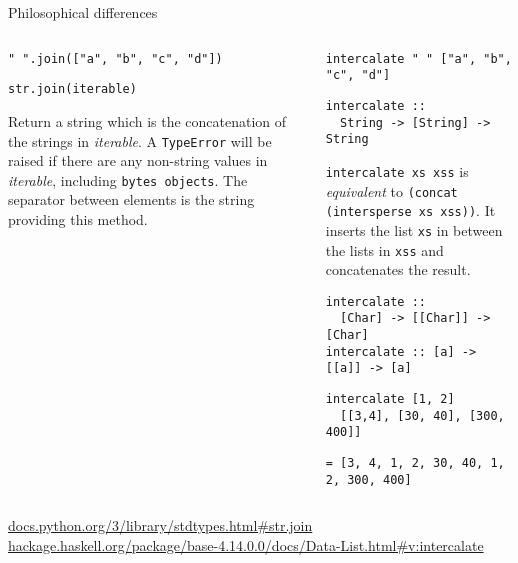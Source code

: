 \documentclass[8pt]{beamer}
\begin{document}
\begin{frame}[fragile]{Philosophical differences}

\pause

\begin{columns}%
\begin{column}{.48\textwidth}
\begin{verbatim}
" ".join(["a", "b", "c", "d"])
\end{verbatim}
\pause
\begin{verbatim}
str.join(iterable)
\end{verbatim}

Return a string which is the concatenation of the strings in \emph{iterable}. A
\verb|TypeError| will be raised if there are any non-string values in \emph{iterable},
including \verb|bytes objects|. The separator between elements is the string providing
this method.


\end{column}
%
\begin{column}{.48\textwidth}
\pause
\begin{verbatim}
intercalate " " ["a", "b", "c", "d"]
\end{verbatim}

\pause
\begin{verbatim}
intercalate :: 
  String -> [String] -> String
\end{verbatim}

\pause
\verb|intercalate xs xss| is \emph{equivalent} to \verb|(concat (intersperse xs xss))|.
It inserts the list \verb|xs| in between the lists in \verb|xss| and concatenates the result.

\pause

\begin{verbatim}
intercalate :: 
  [Char] -> [[Char]] -> [Char]
intercalate :: [a] -> [[a]] -> [a]
\end{verbatim}
\pause

\begin{verbatim}
intercalate [1, 2] 
  [[3,4], [30, 40], [300, 400]]
\end{verbatim}
\pause
\begin{verbatim}
= [3, 4, 1, 2, 30, 40, 1, 2, 300, 400]
\end{verbatim}

\end{column}
\end{columns}

\pause
{\tiny \url{docs.python.org/3/library/stdtypes.html#str.join}}
{\tiny \url{hackage.haskell.org/package/base-4.14.0.0/docs/Data-List.html#v:intercalate}}
\end{frame}
\end{document}
